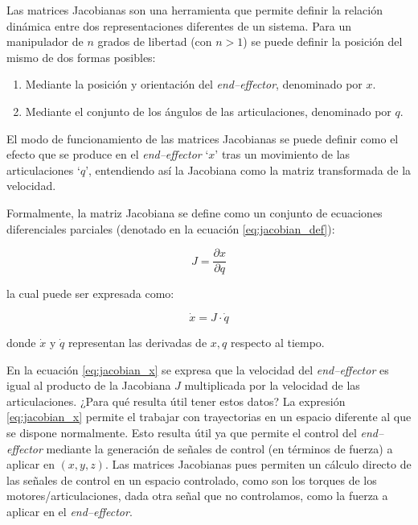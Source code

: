 Las matrices Jacobianas son una herramienta que permite definir la relación
dinámica entre dos representaciones diferentes de un sistema. Para un manipulador
de $n$ grados de libertad (con $n > 1$) se puede definir la posición del mismo de dos
formas posibles:

\begin{enumerate}
    \item Mediante la posición y orientación del \textit{end--effector}, denominado por $x$.
    \item Mediante el conjunto de los ángulos de las articulaciones, denominado por $q$.
\end{enumerate}

El modo de funcionamiento de las matrices Jacobianas se puede definir como el efecto
que se produce en el \textit{end--effector} `$x$' tras un movimiento de las articulaciones
`$q$', entendiendo así la Jacobiana como la matriz transformada de la velocidad.

Formalmente, la matriz Jacobiana se define como un conjunto de ecuaciones diferenciales
parciales (denotado en la ecuación \ref{eq:jacobian_def}):

\begin{equation}\label{eq:jacobian_def}
    J = \frac{\partial x}{\partial q}
\end{equation}

la cual puede ser expresada como:

\begin{equation}\label{eq:jacobian_x}
    \dot{x} = J \cdot \dot{q}
\end{equation}

donde $\dot{x}$ y $\dot{q}$ representan las derivadas de $x, q$ respecto al tiempo.

En la ecuación \ref{eq:jacobian_x} se expresa que la velocidad del \textit{end--effector}
es igual al producto de la Jacobiana $J$ multiplicada por la velocidad de las articulaciones.
¿Para qué resulta útil tener estos datos? La expresión \ref{eq:jacobian_x} permite el
trabajar con trayectorias en un espacio diferente al que se dispone normalmente\cite{travisdewolfRobotControlPart2013a}.
Esto resulta útil ya que permite el control del \textit{end--effector} mediante la
generación de señales de control (en términos de fuerza) a aplicar en $\left(x, y, z\right)$.
Las matrices Jacobianas pues permiten un cálculo directo de las señales de control en un
espacio controlado, como son los torques de los motores/articulaciones, dada otra señal
que no controlamos, como la fuerza a aplicar en el \textit{end--effector}.

